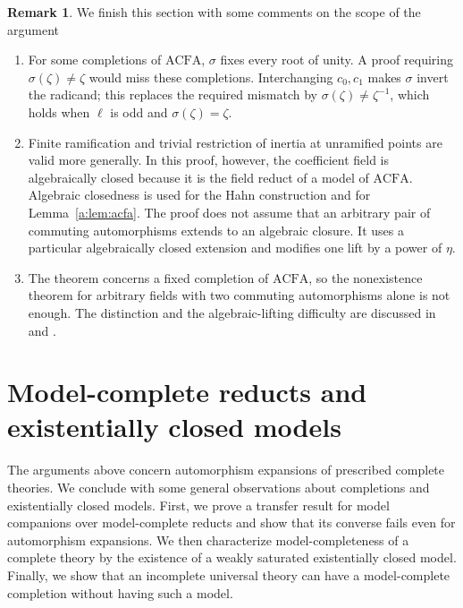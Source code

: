 \documentclass[11pt,a4paper]{amsart}
\theoremstyle{definition}
\newtheorem{remark}[theorem]{Remark}
\newcommand{\ACFA}{\mathrm{ACFA}}
\begin{document}
\begin{remark}We finish this section with some comments on the scope of the argument
\begin{enumerate}
  \item For some completions of $\ACFA$, $\sigma$ fixes every root of unity. A proof requiring $\sigma(\zeta)\neq\zeta$ would miss these completions. Interchanging $c_0,c_1$ makes $\sigma$ invert the radicand; this replaces the required mismatch by $\sigma(\zeta)\neq\zeta^{-1}$, which holds when $\ell$ is odd and $\sigma(\zeta)=\zeta$.

  \item Finite ramification and trivial restriction of inertia at unramified points are valid more generally. In this proof, however, the coefficient field is algebraically closed because it is the field reduct of a model of $\ACFA$. Algebraic closedness is used for the Hahn construction and for Lemma~\ref{a:lem:acfa}. The proof does not assume that an arbitrary pair of commuting automorphisms extends to an algebraic closure. It uses a particular algebraically closed extension and
modifies one lift by a power of $\eta$.

  \item The theorem concerns a fixed completion of $\ACFA$, so the nonexistence theorem for arbitrary fields with two commuting automorphisms alone is not enough. The distinction and the algebraic-lifting difficulty are discussed in \cite[Section 3]{KikyoSurvey} and \cite[Remark 1.12]{Survey}.
\end{enumerate}
\end{remark}


\section{Model-complete reducts and existentially closed models}
\label{sec:mc-reducts}

The arguments above concern automorphism expansions of prescribed
complete theories. We conclude with some general observations
about completions and existentially closed models.
First, we prove a transfer result for model companions over
model-complete reducts and show that its converse fails even
for automorphism expansions. We then characterize model-completeness
of a complete theory by the existence of a weakly saturated
existentially closed model. Finally, we show that an incomplete
universal theory can have a model-complete completion without
having such a model.
\end{document}
